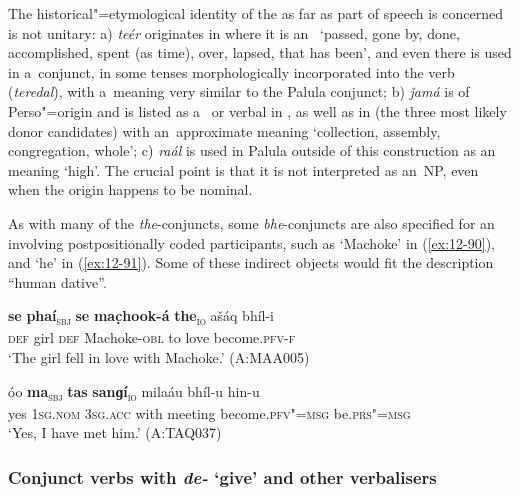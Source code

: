 The historical"=etymological identity of the  as far as part of speech is concerned is not unitary: a) \textit{teér} originates in \iliPashto where it is an~ `passed, gone by, done, accomplished, spent (as time), over, lapsed, that has been', and even there is used in a~conjunct, in some tenses morphologically incorporated into the verb (\textit{teredal}), with a~meaning very similar to the Palula conjunct; b) \textit{ǰamá} is of Perso"=\iliArabic origin and is listed as a~ or verbal  in \iliUrdu, \iliPashto as well as in \iliPersian (the three most likely donor candidates) with an~approximate meaning `collection, assembly, congregation, whole'; c) \textit{raál} is used in Palula outside of this construction as an~ meaning `high'. The crucial point is that it is not interpreted as an~NP, even when the origin happens to be nominal. 


As with many of the \textit{the}-conjuncts, some \textit{bhe}-conjuncts are also specified for an~ involving postpositionally coded participants, such as `Machoke' in (\ref{ex:12-90}), and `he' in (\ref{ex:12-91}). Some of these indirect objects would fit the description ``human dative''. 

\begin{exe}
\ex
\label{ex:12-90}
\gll {\ob}\textbf{se} \textbf{phaí}{\cb}\textsubscript{\textsc{\upshape sbj}} {\ob}\textbf{se} \textbf{mac̣hook-á} \textbf{the}{\cb}\textsubscript{\textsc{\upshape io}} ašáq bhíl-i\\
\textsc{def} girl \textsc{def} Machoke-\textsc{obl} to love  become.\textsc{pfv-f}\\
\glt `The girl fell in love with Machoke.' (A:MAA005)
\end{exe}
\begin{exe}
\ex
\label{ex:12-91}
\gll óo {\ob}\textbf{ma}{\cb}\textsubscript{\textsc{\upshape sbj}} {\ob}\textbf{tas} \textbf{sanɡí}{\cb}\textsubscript{\textsc{\upshape io}} milaáu bhíl-u hin-u\\
yes \textsc{1sg.nom} \textsc{3sg.acc} with meeting become.\textsc{pfv"=msg}  be.\textsc{prs"=msg}\\
\glt `Yes, I have met him.' (A:TAQ037)
\end{exe}

\subsubsection*{Conjunct verbs with \textit{de-} `give' and other verbalisers}

